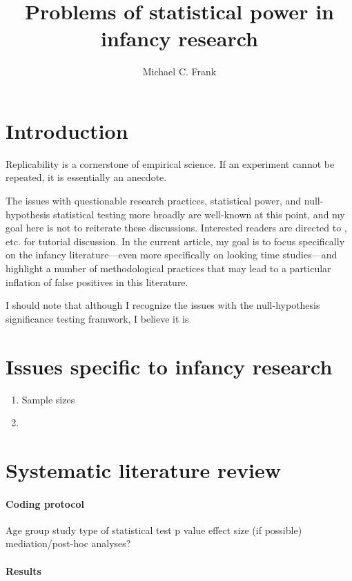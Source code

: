 \documentclass[man,noapacite]{apa2}
\title{Problems of statistical power in infancy research}
\author{Michael C. Frank}
\affiliation{Department of Psychology, Stanford University}
\begin{document}
\maketitle                            

\section{Introduction} 

Replicability is a cornerstone of empirical science. If an experiment cannot be repeated, it is essentially an anecdote. 




The issues with questionable research practices, statistical power, and null-hypothesis statistical testing more broadly are well-known at this point, and my goal here is not to reiterate these discussions. Interested readers are directed to ,  etc. for tutorial discussion. In the current article, my goal is to focus specifically on the infancy literature---even more specifically on looking time studies---and highlight a number of methodological practices that may lead to a particular inflation of false positives in this literature. 

I should note that although I recognize the issues with the null-hypothesis significance testing framwork, I believe it is

\section{Issues specific to infancy research}


\begin{enumerate}
\item Sample sizes
\item 
\end{enumerate}

\section{Systematic literature review}

\paragraph{Coding protocol}

Age group
study
type of statistical test
p value
effect size (if possible)
mediation/post-hoc analyses?

\paragraph{Results}
\end{document}
